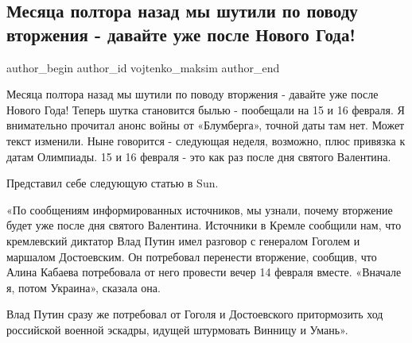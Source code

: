  
 
 
 
 
 
\subsection{Месяца полтора назад мы шутили по поводу вторжения - давайте уже после Нового Года!}
\label{sec:12_02_2022.fb.vojtenko_maksim.1.vtorzhenie_shutki}
 
\ifcmt
 author_begin
   author_id vojtenko_maksim
 author_end
\fi

Месяца полтора назад мы шутили по поводу вторжения - давайте уже после Нового
Года! Теперь шутка становится былью - пообещали на 15 и 16 февраля. Я
внимательно прочитал анонс войны от «Блумберга», точной даты там нет. Может
текст изменили. Ныне говорится - следующая неделя, возможно, плюс привязка к
датам Олимпиады. 15 и 16 февраля - это как раз после дня святого Валентина.

Представил себе следующую статью в Sun. 

«По сообщениям информированных источников, мы узнали, почему вторжение будет
уже после дня святого Валентина. Источники в Кремле сообщили нам, что
кремлевский диктатор Влад Путин имел разговор с генералом Гоголем и маршалом
Достоевским. Он потребовал перенести вторжение, сообщив, что Алина Кабаева
потребовала от него провести вечер 14 февраля вместе. «Вначале я, потом
Украина», сказала она.

Влад Путин сразу же потребовал от Гоголя и Достоевского притормозить ход
российской военной эскадры, идущей штурмовать Винницу и Умань».
